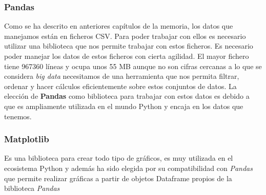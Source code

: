 \subsubsection{Pandas}
Como se ha descrito en anteriores capítulos de la memoria, los datos que manejamos están en ficheros CSV. Para poder trabajar con ellos es necesario utilizar una biblioteca que nos permite trabajar con estos ficheros. Es necesario poder manejar los datos de estos ficheros con cierta agilidad. El mayor fichero tiene 967360 líneas y ocupa unos 55 MB aunque no son cifras cercanas a lo que se considera \textit{big data} necesitamos de una herramienta que nos permita filtrar, ordenar y hacer cálculos eficientemente sobre estos conjuntos de datos. La elección de \textbf{Pandas} como biblioteca para trabajar con estos datos es debido a que es ampliamente utilizada en el mundo Python y encaja en los datos que tenemos.

\subsubsection{Matplotlib}
Es una biblioteca para crear todo tipo de gráficos, es muy utilizada en el ecosistema Python y además ha sido elegida por su compatibilidad con \textit{Pandas} que permite realizar gráficas a partir de objetos Dataframe propios de la biblioteca \textit{Pandas}
